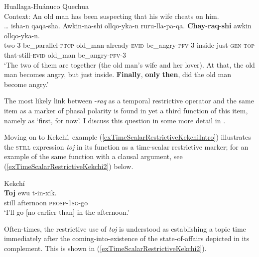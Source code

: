 \begin{exe} 
	\ex Huallaga-Huánuco Quechua\label{exQuechuaFinally}\\
	Context: An old man has been suspecting that his wife cheats on him.\\
	\gll … isha-n qaqa-sha. Awkin-na-shi ollqo-yka-n ruru-lla-pa-qa. \textbf{Chay}-\textbf{raq}-\textbf{shi} awkin ollqo-yka-n.\\
	{} two-3 be\_parallel-\textsc{ptcp} old\_man-already-\textsc{evid} be\_angry-\textsc{pfv}-3 inside-just-\textsc{gen}-\textsc{top} that-still-\textsc{evid} old\_man be\_angry-\textsc{pfv}-3\\
	\glt \lq The two of them are together (the old man’s wife and her lover). At that, the old man becomes angry, but just inside. \textbf{Finally}, \textbf{only} \textbf{then}, did the old man become angry.' \parencite[379]{Weber1989}
\end{exe}

The most likely link between \mbox{-\textit{raq}} as a temporal restrictive operator and the same item as a marker of phasal polarity is found in yet a third function of this item, namely as  \lq first, for now\rq{}. I discuss this question in some more detail in .

 Moving on to Kekchí, example (\ref{exTimeScalarRestrictiveKekchiIntro}) illustrates the \textsc{still} expression \textit{toj} in its function as a time-scalar restrictive marker; for an example of the same function with a clausal argument, see (\ref{exTimeScalarRestrictiveKekchi2}) below.

\begin{exe}	
	\ex Kekchí\label{exTimeScalarRestrictiveKekchiIntro}\\
	\gll \textbf{Toj} ewu t-in-xik.\\
	still afternoon \textsc{prosp}-1\textsc{sg}-go\\
	\glt \lq I'll go [no earlier than] in the afternoon.\rq{ }\parencite[464]{Kockelman2020}
\end{exe}

Often-times, the restrictive use of \textit{toj} is understood as establishing a topic time immediately after the coming-into-existence of the state-of-affairs depicted in its complement. This is shown in (\ref{exTimeScalarRestrictiveKekchi2}).

